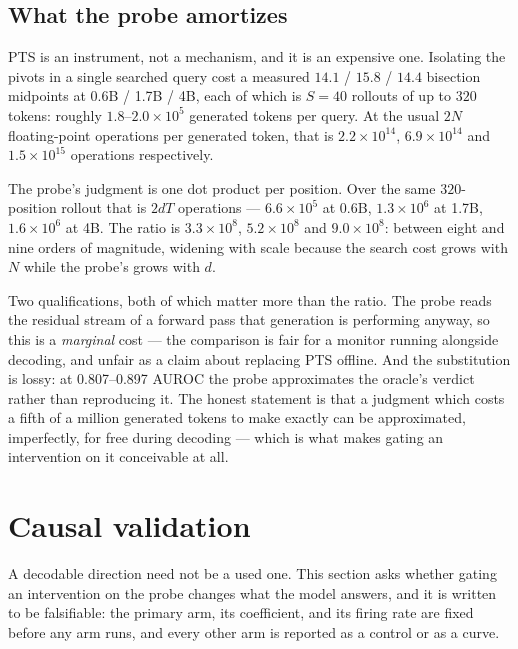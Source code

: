 \documentclass{article}
\begin{document}
\subsection{What the probe amortizes}
\label{sec:amortization}

PTS is an instrument, not a mechanism, and it is an expensive one. Isolating
the pivots in a single searched query cost a measured $14.1$ / $15.8$ /
$14.4$ bisection midpoints at 0.6B / 1.7B / 4B, each of which is $S{=}40$
rollouts of up to $320$ tokens: roughly $1.8$--$2.0 \times 10^{5}$ generated
tokens per query. At the usual $2N$ floating-point operations per generated
token, that is $2.2 \times 10^{14}$, $6.9 \times 10^{14}$ and $1.5 \times
10^{15}$ operations respectively.

The probe's judgment is one dot product per position. Over the same
$320$-position rollout that is $2dT$ operations --- $6.6 \times 10^{5}$ at
0.6B, $1.3 \times 10^{6}$ at 1.7B, $1.6 \times 10^{6}$ at 4B. The ratio is
$3.3 \times 10^{8}$, $5.2 \times 10^{8}$ and $9.0 \times 10^{8}$: between
eight and nine orders of magnitude, widening with scale because the search
cost grows with $N$ while the probe's grows with $d$.

Two qualifications, both of which matter more than the ratio. The probe
reads the residual stream of a forward pass that generation is performing
anyway, so this is a \emph{marginal} cost --- the comparison is fair for a
monitor running alongside decoding, and unfair as a claim about replacing
PTS offline. And the substitution is lossy: at 0.807--0.897 AUROC the probe
approximates the oracle's verdict rather than reproducing it. The honest
statement is that a judgment which costs a fifth of a million generated
tokens to make exactly can be approximated, imperfectly, for free during
decoding --- which is what makes gating an intervention on it conceivable
at all.

\section{Causal validation}
\label{sec:causal}

A decodable direction need not be a used one. This section asks whether
gating an intervention on the probe changes what the model answers, and it
is written to be falsifiable: the primary arm, its coefficient, and its
firing rate are fixed before any arm runs, and every other arm is reported
as a control or as a curve.
\end{document}
